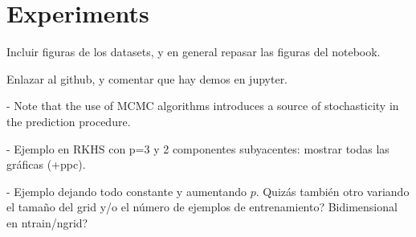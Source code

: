 %
%

\chapter{Experiments}\label{ch:experiments}



\begin{outcomment}
  Incluir figuras de los datasets, y en general repasar las figuras del notebook.

  Enlazar al github, y comentar que hay demos en jupyter.

  - Note that the use of MCMC algorithms introduces a source of stochasticity in the prediction procedure.

  - Ejemplo en RKHS con p=3 y 2 componentes subyacentes: mostrar todas las gráficas (+ppc).

  - Ejemplo dejando todo constante y aumentando \(p\). Quizás también otro variando el tamaño del grid y/o el número de ejemplos de entrenamiento? Bidimensional en ntrain/ngrid?
\end{outcomment}
